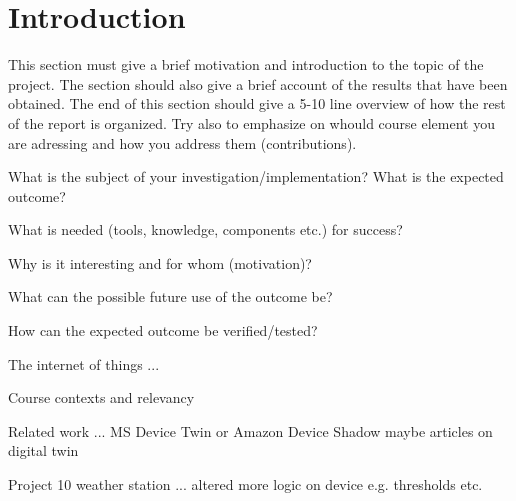 \section{Introduction}
This section must give a brief motivation and
introduction to the topic of the project. The section should also give a brief account of the
results that have been obtained. The end of this section should give a 5-10 line overview of
how the rest of the report is organized. Try also to emphasize on whould course element
you are adressing and how you address them (contributions).

What is the subject of your investigation/implementation?
What is the expected outcome?

What is needed (tools, knowledge, components etc.) for success?

Why is it interesting and for whom (motivation)?

What can the possible future use of the outcome be?

How can the expected outcome be verified/tested?

The internet of things ...

Course contexts and relevancy

Related work ...  MS Device Twin or Amazon Device Shadow maybe articles on digital twin 

Project 10 weather station ... altered more logic on device e.g. thresholds etc.
\pagebreak

